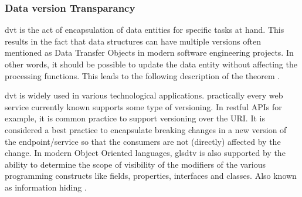 \subsubsection*{Data version Transparancy}

\gls{dvt} is the act of encapsulation of data entities for specific tasks at hand. This
results in the fact that data structures can have multiple versions often mentioned as
Data Transfer Objects in modern software engineering projects. In other words, it should
be possible to update the data entity without affecting the processing functions. This
leads to the following description of the theorem \parencite[280]{mannaert_normalized_2016}.


\gls{dvt} is widely used in various technological applications. practically every web
service currently known supports some type of versioning. In restful APIs for example, it
is common practice to support versioning over the URI. It is considered a best practice
to encapsulate breaking changes in a new version of the endpoint/service so that the
consumers are not (directly) affected by the change. In modern Object Oriented languages,
gls{dtv} is also supported by the ability to determine the scope of visibility of the
modifiers of the various programming constructs like fields, properties, interfaces and
classes. Also known as information hiding
\parencites{parnas_criteria_1972}[278]{mannaert_normalized_2016}.